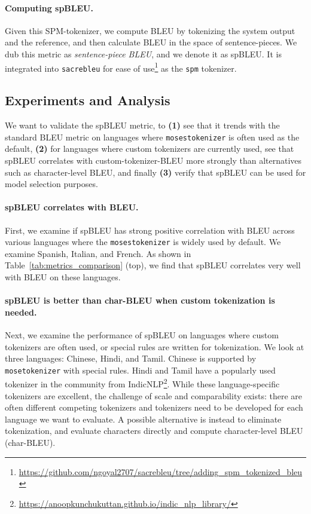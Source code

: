 \paragraph{Computing spBLEU.} Given this SPM-tokenizer, we compute BLEU by tokenizing the system output and the reference, and then calculate BLEU in the space of sentence-pieces. We dub this metric as \textit{sentence-piece BLEU}, and we denote it as spBLEU. It is integrated into \texttt{sacrebleu} for ease of use\footnote{\url{https://github.com/ngoyal2707/sacrebleu/tree/adding_spm_tokenized_bleu}} as the \texttt{spm} tokenizer.

\subsection{Experiments and Analysis} We want to validate the spBLEU metric, to \textbf{(1)} see that it trends with the standard BLEU metric on languages where \texttt{mosestokenizer} is often used as the default, \textbf{(2)} for languages where custom tokenizers are currently used, see that spBLEU correlates with custom-tokenizer-BLEU more strongly than alternatives such as character-level BLEU, and finally \textbf{(3)} verify that spBLEU can be used for model selection purposes. 

\paragraph{spBLEU correlates with BLEU.} First, we examine if spBLEU has strong positive correlation with BLEU across various languages where the \texttt{mosestokenizer} is widely used by default. We examine Spanish, Italian, and French. As shown in Table~\ref{tab:metrics_comparison} (top), we find that spBLEU correlates very well with BLEU on these languages. 

\paragraph{spBLEU is better than char-BLEU when custom tokenization is needed.} Next, we examine the performance of spBLEU on languages where custom tokenizers are often used, or special rules are written for tokenization. We look at three languages: Chinese, Hindi, and Tamil. Chinese is supported by \texttt{mosetokenizer} with special rules. Hindi and Tamil have a popularly used tokenizer in the community from IndicNLP\footnote{\url{https://anoopkunchukuttan.github.io/indic_nlp_library/}}.
While these language-specific tokenizers are excellent, the challenge of scale and comparability exists: there are often different competing tokenizers and tokenizers need to be developed for each language we want to evaluate. A possible alternative is instead to eliminate tokenization, and evaluate characters directly and compute character-level BLEU (char-BLEU). 

